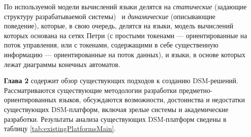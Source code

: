 По используемой модели вычислений языки делятся на \textit{статические} (задающие структуру разрабатываемой системы) \
и \textit{динамические} (описывающие поведение), которые, в свою очередь, делятся на языки, 
модель вычислений которых основана на сетях Петри (с простыми токенами --- ориентированные на поток управления,
или с токенами, содержащими в себе существенную информацию --- ориентированные на поток данных),
и языки, в основе которых лежат диаграммы конечных автоматов.

\textbf{Глава 2} содержит обзор существующих подходов к созданию DSM-решений. 
Рассматриваются существующие методологии разработки предметно-ориентированных языков,
обсуждаются возможности, достоинства и недостатки существующих DSM-платформ, 
включая зрелые системы и академические разработки. Результаты анализа существующих 
DSM-платформ сведены в таблицу \ref{tab:existingPlatformsMain}.

